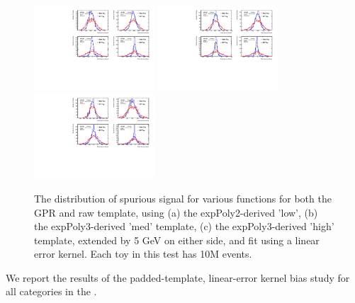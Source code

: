 \begin{figure} 
\begin{center}
  \includegraphics[width=0.4\textwidth]{figures/background/gpr/validation/linear/ToyTest_FitSigVals_lowpT_10M_noSig}   
  \includegraphics[width=0.4\textwidth]{figures/background/gpr/validation/linear/ToyTest_FitSigVals_medpT_10M_noSig}   
  \includegraphics[width=0.4\textwidth]{figures/background/gpr/validation/linear/ToyTest_FitSigVals_highpT_10M_noSig}   
\caption{The distribution of spurious signal for various functions for both the GPR and raw template, using (a) the expPoly2-derived 'low', (b) the expPoly3-derived 'med' template, (c) the expPoly3-derived 'high' template, extended by 5 GeV on either side, and fit using a linear error kernel. Each toy in this test has 10M events.}
\label{fig:linearkernel_lowpt_10M_noSig}
\end{center}
\end{figure}

We report the results of the padded-template, linear-error kernel bias study for all categories in the \Tab{\ref{tab:NoSigSSlinear}}. 


